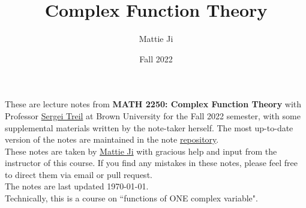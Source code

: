 \documentclass{article}
\title{Complex Function Theory}
\author{Mattie Ji}
\date{Fall 2022}
\begin{document}
\maketitle
These are lecture notes from \textbf{MATH 2250: Complex Function Theory} with Professor \href{https://sites.google.com/a/brown.edu/sergei-treil-homepage/home}{Sergei Treil} at Brown University for the Fall 2022 semester, with some supplemental materials written by the note-taker herself. The most up-to-date version of the notes are maintained in the note \href{https://github.com/maroon-scorch/MATH2550-notes}{repository}.\\

These notes are taken by \href{https://github.com/maroon-scorch}{Mattie Ji} with gracious help and input from the instructor of this course. If you find any mistakes in these notes, please feel free to direct them via email or pull request.\\

The notes are last updated \today.\\

Technically, this is a course on ``functions of ONE complex variable".
\tableofcontents
\newpage












\end{document}
